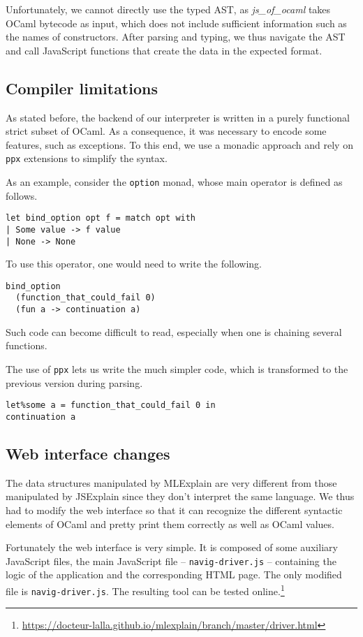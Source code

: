 \documentclass[twocolumn]{article}
\begin{document}
Unfortunately, we cannot directly use the typed AST, as \emph{js\_of\_ocaml}
takes OCaml bytecode as input, which does not include sufficient information
such as the names of constructors. After parsing and typing, we thus navigate
the AST and call JavaScript functions that create the data in the expected format.

\subsection{Compiler limitations}

As stated before, the backend of our interpreter is written in a purely
functional strict subset of OCaml. As a consequence, it was necessary to encode
some features, such as exceptions. To this end, we use a monadic approach and
rely on \texttt{ppx} extensions to simplify the syntax.

As an example, consider the \texttt{option} monad, whose main operator is
defined as follows.

\begin{verbatim}
let bind_option opt f = match opt with
| Some value -> f value
| None -> None
\end{verbatim}

To use this operator, one would need to write the following.
\begin{verbatim}
bind_option
  (function_that_could_fail 0)
  (fun a -> continuation a)
\end{verbatim}
Such code can become difficult to read, especially when one is chaining several
functions.

The use of \texttt{ppx} lets us write the much simpler code, which is
transformed to the previous version during parsing.
\begin{verbatim}
let%some a = function_that_could_fail 0 in
continuation a
\end{verbatim}

\subsection{Web interface changes}

The data structures manipulated by MLExplain are very different from those
manipulated by JSExplain since they don't interpret the same language. We thus
had to modify the web interface so that it can recognize the different syntactic
elements of OCaml and pretty print them correctly as well as OCaml values.

Fortunately the web interface is very simple. It is composed of some auxiliary
JavaScript files, the main JavaScript file -- \texttt{navig-driver.js} --
containing the logic of the application and the corresponding HTML page. The
only modified file is \texttt{navig-driver.js}. The resulting tool can be tested
online.\footnote{\url{https://docteur-lalla.github.io/mlexplain/branch/master/driver.html}}
\end{document}
